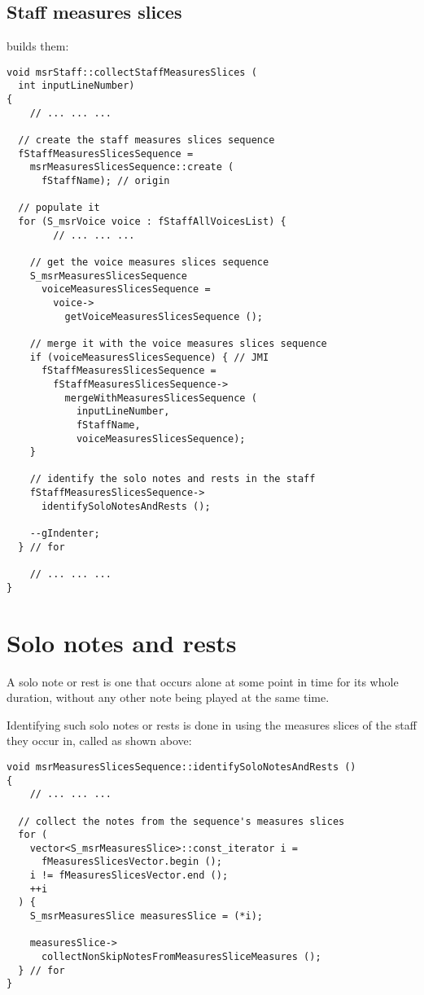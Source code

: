 \subsection{Staff measures slices}

 builds them:
\begin{lstlisting}[language=CPlusPlus]
void msrStaff::collectStaffMeasuresSlices (
  int inputLineNumber)
{
	// ... ... ...

  // create the staff measures slices sequence
  fStaffMeasuresSlicesSequence =
    msrMeasuresSlicesSequence::create (
      fStaffName); // origin

  // populate it
  for (S_msrVoice voice : fStaffAllVoicesList) {
		// ... ... ...

    // get the voice measures slices sequence
    S_msrMeasuresSlicesSequence
      voiceMeasuresSlicesSequence =
        voice->
          getVoiceMeasuresSlicesSequence ();

    // merge it with the voice measures slices sequence
    if (voiceMeasuresSlicesSequence) { // JMI
      fStaffMeasuresSlicesSequence =
        fStaffMeasuresSlicesSequence->
          mergeWithMeasuresSlicesSequence (
            inputLineNumber,
            fStaffName,
            voiceMeasuresSlicesSequence);
    }

    // identify the solo notes and rests in the staff
    fStaffMeasuresSlicesSequence->
      identifySoloNotesAndRests ();

    --gIndenter;
  } // for

	// ... ... ...
}
\end{lstlisting}


\section{Solo notes and rests}

A solo note or rest is one that occurs alone at some point in time for its whole duration, without any other note being played at the same time.

Identifying such solo notes or rests is done in  using the measures slices of the staff they occur in, called  as shown above:
\begin{lstlisting}[language=CPlusPlus]
void msrMeasuresSlicesSequence::identifySoloNotesAndRests ()
{
	// ... ... ...

  // collect the notes from the sequence's measures slices
  for (
    vector<S_msrMeasuresSlice>::const_iterator i =
      fMeasuresSlicesVector.begin ();
    i != fMeasuresSlicesVector.end ();
    ++i
  ) {
    S_msrMeasuresSlice measuresSlice = (*i);

    measuresSlice->
      collectNonSkipNotesFromMeasuresSliceMeasures ();
  } // for
}
\end{lstlisting}


